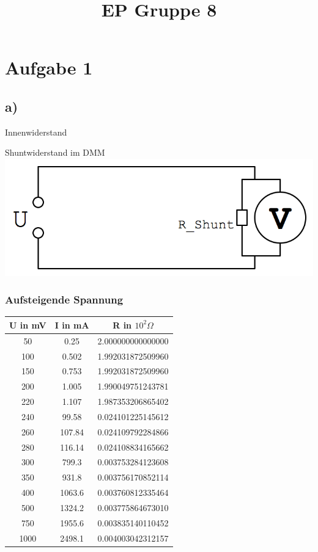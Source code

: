 \documentclass[compress,11pt]{beamer}
\title{EP Gruppe 8}
\begin{document}
\frame[c]{\titlepage}
\begin{frame}
\tableofcontents
\end{frame}

\section{Aufgabe 1}
\subsection{a)}
\begin{frame}{Innenwiderstand}
\begin{block}{Shuntwiderstand im DMM}
\includegraphics[width=\textwidth]{images/1a.png} %
\end{block}
\end{frame}


\begin{frame}
\subsubsection{Aufsteigende Spannung}
\begin{tabular}{|c|c|c|}
\hline 
U in mV & I in mA & R in $ 10^2 \Omega$ \\
\hline
    50  &    0.25  &2.000000000000000 \\
    100  &   0.502  & 1.992031872509960 \\
    150   &  0.753  & 1.992031872509960 \\
    200  &   1.005  & 1.990049751243781 \\
    220  &   1.107  & 1.987353206865402 \\
    240  &   99.58  & 0.024101225145612 \\
    260  &   107.84 & 0.024109792284866 \\
    280  &   116.14 & 0.024108834165662 \\
    300  &   799.3  & 0.003753284123608 \\
    350  &   931.8  & 0.003756170852114 \\
    400  &   1063.6 & 0.003760812335464 \\
    500  &   1324.2 & 0.003775864673010 \\
    750  &   1955.6 & 0.003835140110452 \\
    1000 &   2498.1 & 0.004003042312157 \\

\hline 
\end{tabular} 
\end{frame}
\end{document}
